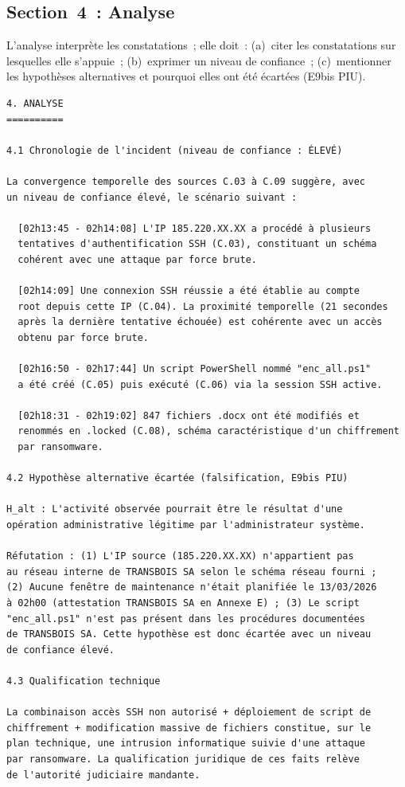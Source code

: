 \subsection{Section~4~: Analyse}

L'analyse interprète les constatations~; elle doit~:
(a)~citer les constatations sur lesquelles elle s'appuie~;
(b)~exprimer un niveau de confiance~;
(c)~mentionner les hypothèses alternatives et pourquoi elles ont été
écartées (E9bis PIU).

\begin{lstlisting}[language=bash_forensique,
    caption={Section Analyse -- exemple MVOM}]
4. ANALYSE
==========

4.1 Chronologie de l'incident (niveau de confiance : ÉLEVÉ)

La convergence temporelle des sources C.03 à C.09 suggère, avec
un niveau de confiance élevé, le scénario suivant :

  [02h13:45 - 02h14:08] L'IP 185.220.XX.XX a procédé à plusieurs
  tentatives d'authentification SSH (C.03), constituant un schéma
  cohérent avec une attaque par force brute.

  [02h14:09] Une connexion SSH réussie a été établie au compte
  root depuis cette IP (C.04). La proximité temporelle (21 secondes
  après la dernière tentative échouée) est cohérente avec un accès
  obtenu par force brute.

  [02h16:50 - 02h17:44] Un script PowerShell nommé "enc_all.ps1"
  a été créé (C.05) puis exécuté (C.06) via la session SSH active.

  [02h18:31 - 02h19:02] 847 fichiers .docx ont été modifiés et
  renommés en .locked (C.08), schéma caractéristique d'un chiffrement
  par ransomware.

4.2 Hypothèse alternative écartée (falsification, E9bis PIU)

H_alt : L'activité observée pourrait être le résultat d'une
opération administrative légitime par l'administrateur système.

Réfutation : (1) L'IP source (185.220.XX.XX) n'appartient pas
au réseau interne de TRANSBOIS SA selon le schéma réseau fourni ;
(2) Aucune fenêtre de maintenance n'était planifiée le 13/03/2026
à 02h00 (attestation TRANSBOIS SA en Annexe E) ; (3) Le script
"enc_all.ps1" n'est pas présent dans les procédures documentées
de TRANSBOIS SA. Cette hypothèse est donc écartée avec un niveau
de confiance élevé.

4.3 Qualification technique

La combinaison accès SSH non autorisé + déploiement de script de
chiffrement + modification massive de fichiers constitue, sur le
plan technique, une intrusion informatique suivie d'une attaque
par ransomware. La qualification juridique de ces faits relève
de l'autorité judiciaire mandante.
\end{lstlisting}

